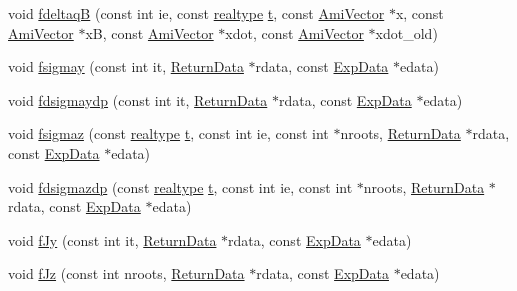 \begin{DoxyCompactItemize}
void \mbox{\hyperlink{classamici_1_1_model_aef4944ffd8a1b4f9a92ce1f8923af695}{fdeltaqB}} (const int ie, const \mbox{\hyperlink{namespaceamici_a1bdce28051d6a53868f7ccbf5f2c14a3}{realtype}} \mbox{\hyperlink{classamici_1_1_model_a711281d57e9710226face29151cc4641}{t}}, const \mbox{\hyperlink{classamici_1_1_ami_vector}{Ami\+Vector}} $\ast$x, const \mbox{\hyperlink{classamici_1_1_ami_vector}{Ami\+Vector}} $\ast$xB, const \mbox{\hyperlink{classamici_1_1_ami_vector}{Ami\+Vector}} $\ast$xdot, const \mbox{\hyperlink{classamici_1_1_ami_vector}{Ami\+Vector}} $\ast$xdot\+\_\+old)
\item 
void \mbox{\hyperlink{classamici_1_1_model_af729c798cfe341d7bef0ecba62800dd7}{fsigmay}} (const int it, \mbox{\hyperlink{classamici_1_1_return_data}{Return\+Data}} $\ast$rdata, const \mbox{\hyperlink{classamici_1_1_exp_data}{Exp\+Data}} $\ast$edata)
\item 
void \mbox{\hyperlink{classamici_1_1_model_acd0838d3644e9232cc2e65d7a8c956cf}{fdsigmaydp}} (const int it, \mbox{\hyperlink{classamici_1_1_return_data}{Return\+Data}} $\ast$rdata, const \mbox{\hyperlink{classamici_1_1_exp_data}{Exp\+Data}} $\ast$edata)
\item 
void \mbox{\hyperlink{classamici_1_1_model_a55798a44d65a15c907e74f4738efb994}{fsigmaz}} (const \mbox{\hyperlink{namespaceamici_a1bdce28051d6a53868f7ccbf5f2c14a3}{realtype}} \mbox{\hyperlink{classamici_1_1_model_a711281d57e9710226face29151cc4641}{t}}, const int ie, const int $\ast$nroots, \mbox{\hyperlink{classamici_1_1_return_data}{Return\+Data}} $\ast$rdata, const \mbox{\hyperlink{classamici_1_1_exp_data}{Exp\+Data}} $\ast$edata)
\item 
void \mbox{\hyperlink{classamici_1_1_model_a0c9fd2d7e184d44745130d7ffa2a0075}{fdsigmazdp}} (const \mbox{\hyperlink{namespaceamici_a1bdce28051d6a53868f7ccbf5f2c14a3}{realtype}} \mbox{\hyperlink{classamici_1_1_model_a711281d57e9710226face29151cc4641}{t}}, const int ie, const int $\ast$nroots, \mbox{\hyperlink{classamici_1_1_return_data}{Return\+Data}} $\ast$rdata, const \mbox{\hyperlink{classamici_1_1_exp_data}{Exp\+Data}} $\ast$edata)
\item 
void \mbox{\hyperlink{classamici_1_1_model_ad8fd49506b1d288ded2c036318f3ca51}{f\+Jy}} (const int it, \mbox{\hyperlink{classamici_1_1_return_data}{Return\+Data}} $\ast$rdata, const \mbox{\hyperlink{classamici_1_1_exp_data}{Exp\+Data}} $\ast$edata)
\item 
void \mbox{\hyperlink{classamici_1_1_model_a00e31d4a939e96476f2dc67bc930054c}{f\+Jz}} (const int nroots, \mbox{\hyperlink{classamici_1_1_return_data}{Return\+Data}} $\ast$rdata, const \mbox{\hyperlink{classamici_1_1_exp_data}{Exp\+Data}} $\ast$edata)

\end{DoxyCompactItemize}
